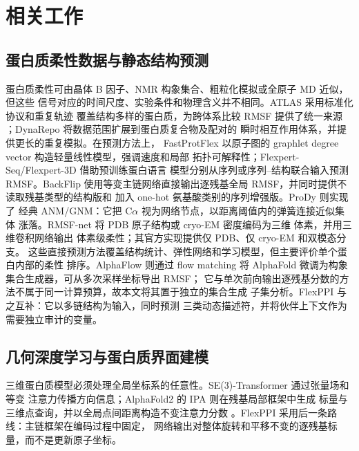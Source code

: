 
\section{相关工作}

\subsection{蛋白质柔性数据与静态结构预测}

蛋白质柔性可由晶体 B 因子、NMR 构象集合、粗粒化模拟或全原子 MD 近似，但这些
信号对应的时间尺度、实验条件和物理含义并不相同。ATLAS 采用标准化协议和重复轨迹
覆盖结构多样的蛋白质，为跨体系比较 RMSF 提供了统一来源
\cite{vandermeersche2024atlas}；DynaRepo 将数据范围扩展到蛋白质复合物及配对的
瞬时相互作用体系，并提供更长的重复模拟\cite{mokhtari2026dynarepo}。在预测方法上，
FastProtFlex 以原子图的 graphlet degree vector 构造轻量线性模型，强调速度和局部
拓扑可解释性\cite{praznikar2026fast}；Flexpert-Seq/Flexpert-3D 借助预训练蛋白语言
模型分别从序列或序列--结构联合输入预测 RMSF\cite{kouba2025flexpert}。BackFlip
使用等变主链网络直接输出逐残基全局 RMSF，并同时提供不读取残基类型的结构版和
加入 one-hot 氨基酸类别的序列增强版\cite{viliuga2025backflip}。ProDy 则实现了
经典 ANM/GNM：它把 C$\alpha$ 视为网络节点，以距离阈值内的弹簧连接近似集体
涨落\cite{zhang2021prody}。RMSF-net 将 PDB 原子结构或 cryo-EM 密度编码为三维
体素，并用三维卷积网络输出
体素级柔性；其官方实现提供仅 PDB、仅 cryo-EM 和双模态分支\cite{song2024rmsfnet}。
这些直接预测方法覆盖结构统计、弹性网络和学习模型，但主要评价单个蛋白内部的柔性
排序。AlphaFlow 则通过 flow matching 将
AlphaFold 微调为构象集合生成器，可从多次采样坐标导出 RMSF\cite{jing2024alphaflow}；
它与单次前向输出逐残基分数的方法不属于同一计算预算，故本文将其置于独立的集合生成
子集分析。FlexPPI 与之互补：它以多链结构为输入，同时预测
三类动态描述符，并将伙伴上下文作为需要独立审计的变量。

\subsection{几何深度学习与蛋白质界面建模}

三维蛋白质模型必须处理全局坐标系的任意性。SE(3)-Transformer 通过张量场和等变
注意力传播方向信息\cite{fuchs2020se3}；AlphaFold2 的 IPA 则在残基局部框架中生成
标量与三维点查询，并以全局点间距离构造不变注意力分数
\cite{jumper2021alphafold}。FlexPPI 采用后一条路线：主链框架在编码过程中固定，
网络输出对整体旋转和平移不变的逐残基标量，而不是更新原子坐标。

